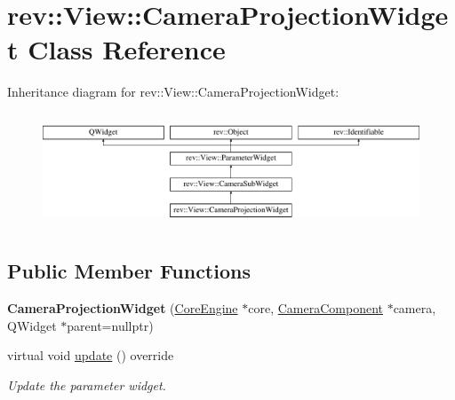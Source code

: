 \hypertarget{classrev_1_1_view_1_1_camera_projection_widget}{}\section{rev\+::View\+::Camera\+Projection\+Widget Class Reference}
\label{classrev_1_1_view_1_1_camera_projection_widget}
Inheritance diagram for rev\+::View\+::Camera\+Projection\+Widget\+:\begin{figure}[H]
\begin{center}
\leavevmode
\includegraphics[height=3.425076cm]{classrev_1_1_view_1_1_camera_projection_widget}
\end{center}
\end{figure}
\subsection*{Public Member Functions}
\begin{DoxyCompactItemize}
\item 
\mbox{\label{classrev_1_1_view_1_1_camera_projection_widget_a857cbcf5eb698006e2b26baf81353b16}} 
{\bfseries Camera\+Projection\+Widget} (\mbox{\hyperlink{classrev_1_1_core_engine}{Core\+Engine}} $\ast$core, \mbox{\hyperlink{classrev_1_1_camera_component}{Camera\+Component}} $\ast$camera, Q\+Widget $\ast$parent=nullptr)
\item 
\mbox{\label{classrev_1_1_view_1_1_camera_projection_widget_a5a8e653cf519ca69e42a16edcfbdf368}} 
virtual void \mbox{\hyperlink{classrev_1_1_view_1_1_camera_projection_widget_a5a8e653cf519ca69e42a16edcfbdf368}{update}} () override
\begin{DoxyCompactList}\small\item\em Update the parameter widget. \end{DoxyCompactList}\end{DoxyCompactItemize}
